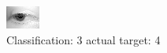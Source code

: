 \begin{figure}[h!]
\begin{center}
\includegraphics[width=0.60\columnwidth]{figures/ID2628_class_3_target_4.png}
\end{center}
\caption{ Classification: 3 actual target: 4}
\label{fig:ID2628_class_3_target_4}
\end{figure}
